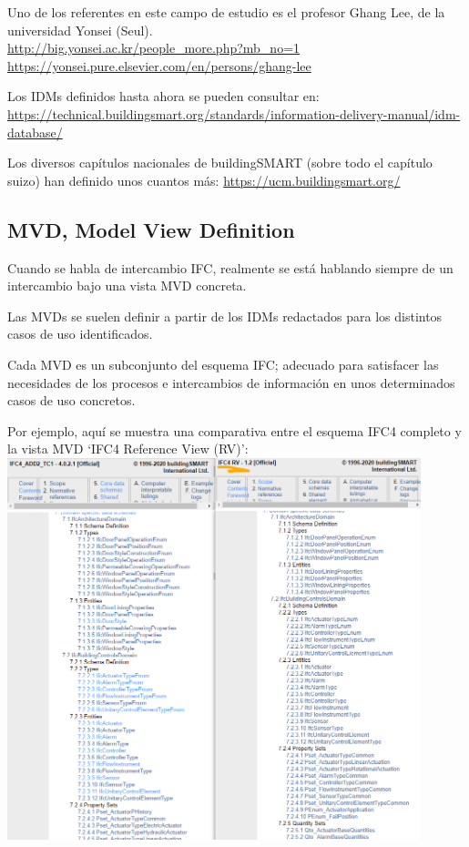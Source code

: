 \documentclass[spanish,10pt,a4paper,final,oneside]{article}
\begin{document}
Uno de los referentes en este campo de estudio es el profesor Ghang Lee, de la universidad Yonsei (Seul).
\\ \url{http://big.yonsei.ac.kr/people_more.php?mb_no=1}
\\ \url{https://yonsei.pure.elsevier.com/en/persons/ghang-lee}

\vspace{0.5cm}


\vspace{0.3cm}

Los IDMs definidos hasta ahora se pueden consultar en: \url{https://technical.buildingsmart.org/standards/information-delivery-manual/idm-database/}

Los diversos capítulos nacionales de buildingSMART (sobre todo el capítulo suizo) han definido unos cuantos más: \url{https://ucm.buildingsmart.org/}


\subsection{MVD, Model View Definition}

Cuando se habla de intercambio IFC, realmente se está hablando siempre de un intercambio bajo una vista MVD concreta.

Las MVDs se suelen definir a partir de los IDMs redactados para los distintos casos de uso identificados. 

Cada MVD es un subconjunto del esquema IFC; adecuado para satisfacer las necesidades de los procesos e intercambios de información en unos determinados casos de uso concretos.

\newpage
Por ejemplo, aquí se muestra una comparativa entre el esquema IFC4 completo y la vista MVD `IFC4 Reference View (RV)':
\\ \includegraphics[width=0.9\textwidth]{MVD es un subconjunto del esquema IFC}
\end{document}
